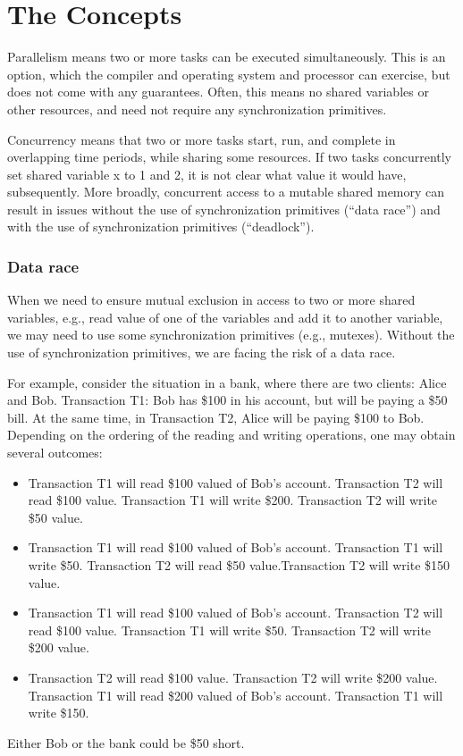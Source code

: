 \chapter{The Concepts}
\label{ch:concepts}

Parallelism means two or more tasks can be executed simultaneously. This is an option, which the compiler and operating system and processor can exercise, but does not come with any guarantees. 
Often, this means no shared variables or other resources, and need not require any synchronization primitives.

Concurrency means that two or more tasks start, run, and complete in overlapping time periods, while sharing some resources. 
If two tasks concurrently set shared variable x to 1 and 2, it is not clear what value it would have, subsequently.
More broadly, concurrent access to a mutable shared memory can result in issues without the use of synchronization 
primitives (``data race'') and with the use of synchronization primitives (``deadlock'').

\subsection{Data race}

When we need to ensure mutual exclusion in access to two or more shared variables, 
e.g., read value of one of the variables and add it to another variable, 
we may need to use some synchronization primitives (e.g., mutexes).
Without the use of synchronization primitives, we are facing the risk of a data race. 

For example, consider the situation in a bank, where there are two clients:
Alice and Bob. 
Transaction T1: Bob has \$100 in his account, but will be paying a \$50 bill. 
At the same time, in Transaction T2, Alice will be paying \$100 to Bob.
Depending on the ordering of the reading and writing operations, one may obtain several outcomes:
\begin{itemize}
\item Transaction T1 will read \$100 valued of Bob's account. Transaction T2 will read \$100 value.
 Transaction T1 will write \$200. Transaction T2 will write \$50 value.
\item Transaction T1 will read \$100 valued of Bob's account. 
 Transaction T1 will write \$50. Transaction T2 will read \$50 value.Transaction T2 will write \$150 value.
\item Transaction T1 will read \$100 valued of Bob's account. Transaction T2 will read \$100 value.
 Transaction T1 will write \$50. Transaction T2 will write \$200 value.
\item Transaction T2 will read \$100 value. Transaction T2 will write \$200 value.
  Transaction T1 will read \$200 valued of Bob's account.  Transaction T1 will write \$150.  
\end{itemize}
Either Bob or the bank could be \$50 short. 


